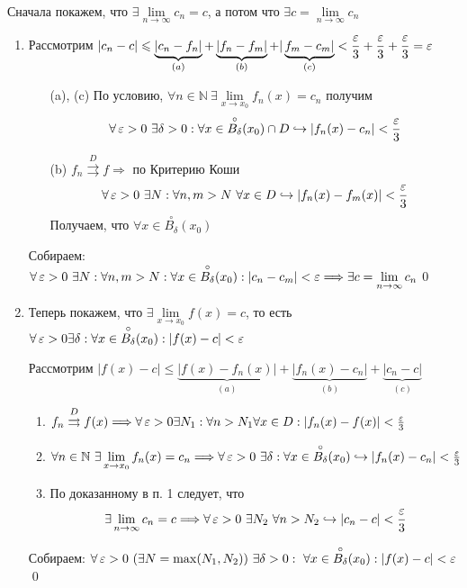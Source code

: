 \documentclass[a4paper, 10pt]{article}
\begin{document}
\proof Сначала покажем, что $\exists\lim\limits_{n\to\infty }c_n=c$, а потом что $\exists c=\lim\limits_{n\to\infty }c_n$
\begin{enumerate}
    \item Рассмотрим $|c_n-c|\leqslant\underbrace{|c_n-f_n|}_{(a)}+\underbrace{|f_n-f_m|}_{(b)}+|\underbrace{f_m-c_m|}_{(c)}<\displaystyle\frac{\operatorname{\varepsilon}}{3}+\frac{\operatorname{\varepsilon}}{3}+\frac{\operatorname{\varepsilon}}{3}=\operatorname{\varepsilon}$
    \begin{enumerate}
        \item[(a), (c)] По условию, $\forall n\in\mathbb{N}\ \exists \lim\limits_{x\to x_0} f_n(x)=c_n$ получим 
        \begin{equation*}
            \forall\ve>0\ \exists\delta>0:\forall x\in \overset{\circ}{B_{\delta}}(x_0)\cap D\hookrightarrow|f_n(x)-c_n|<\frac{\ve}{3}
        \end{equation*}
        \item[(b)] $f_n\overset{D}{\rightrightarrows} f\Longrightarrow$ по Критерию Коши 
        \begin{equation*}
            \forall\operatorname{\varepsilon}>0\ \exists N:\forall n,m>N\ \forall x\in D\hookrightarrow|f_n(x)-f_m(x)|<\frac{\operatorname{\varepsilon}}{3}
        \end{equation*}
        Получаем, что $\forall x\in \overset{\circ}{B_{\delta}}(x_0)$
    \end{enumerate}
    Собираем: $\forall\operatorname{\varepsilon}>0\ \exists N:\forall n,m>N:\forall x\in \overset{\circ}{B_{\delta}}(x_0):|c_n-c_m|<\operatorname{\varepsilon}\Longrightarrow\exists c=\lim\limits_{n\to\infty} c_n$\qed

    \item Теперь покажем, что $\exists\lim\limits_{x\to x_0}f(x)=c$, то есть $\forall\operatorname{\varepsilon}>0\exists\delta:\forall x\in \overset{\circ}{B_{\delta}}(x_0): |f(x)-c|<\operatorname{\varepsilon}$

    Рассмотрим $|f(x)-c|\leqslant\underbrace{|f(x)-f_n(x)|}_{(a)}+\underbrace{|f_n(x)-c_n|}_{(b)}+\underbrace{|c_n-c|}_{(c)}$
    \begin{enumerate}
        \item $f_n\overset{D}{\rightrightarrows} f(x)\Longrightarrow\forall\operatorname{\varepsilon}>0\exists N_1:\forall n>N_1\forall x\in D:|f_n(x)-f(x)|<\frac{\operatorname{\varepsilon}}{3}$
        \item $\forall n\in\mathbb{N}\ \exists\lim\limits_{x\to x_0}f_n(x)=c_n\Longrightarrow \forall \ve>0\ \exists\delta:\forall x\in \overset{\circ}{B_{\delta}}(x_0)\hookrightarrow|f_n(x)-c_n|<\frac{\ve}{3}$
        \item По доказанному в п. 1 следует, что
        \begin{equation*}
            \exists\lim_{n\to\infty} c_n=c\Longrightarrow \forall\operatorname{\varepsilon}>0\ \exists N_2\ \forall n>N_2\hookrightarrow|c_n-c|<\frac{\operatorname{\varepsilon}}{3}
        \end{equation*}
    \end{enumerate}

    Собираем: $\forall\operatorname{\varepsilon}>0\ (\exists N=\max(N_1,N_2))\ \exists\delta>0:\ \forall x\in\overset{\circ}{B_{\delta}}(x_0):|f(x)-c|<\operatorname{\varepsilon}$\qed
\end{enumerate}
\end{document}
